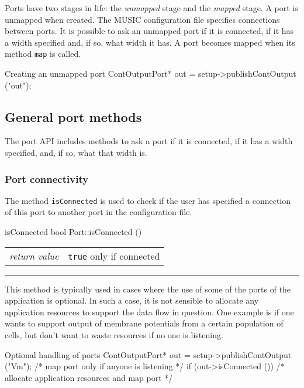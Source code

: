 \documentclass[a4paper,twoside]{report}
\makeatletter
\newenvironment{parameters}%
{\begin{tabular}{@{\hspace{2em}}lp{0.6\textwidth}}}%
{\end{tabular}\par\vspace{1mm}\par\hrule\par\vspace{5mm}}
\makeatother
\begin{document}
\pagebreak
Ports have two stages in life: the \emph{unmapped} stage and the
\emph{mapped} stage.  A port is unmapped when created.  The MUSIC
configuration file specifies connections between ports.  It is
possible to ask an unmapped port if it is connected, if it has a width
specified and, if so, what width it has.  A port becomes mapped when
its method \lstinline|map| is called.

\begin{code}{Creating an unmapped port}
ContOutputPort* out =
   setup->publishContOutput ("out");
\end{code}

\subsection{General port methods}

The port API includes methods to ask a port if it is connected, if it
has a width specified, and, if so, what that width is.

\subsubsection{Port connectivity}

The method \lstinline|isConnected| is used to check if the user has
specified a connection of this port to another port in the
configuration file.

\begin{head}{isConnected}
  bool Port::isConnected ()
\end{head}
\begin{parameters}
  \emph{return value} & \lstinline|true| only if connected\\
\end{parameters}

This method is typically used in cases where the use of some of the
ports of the application is optional.  In such a case, it is not
sensible to allocate any application resources to support the data
flow in question.  One example is if one wants to support output of
membrane potentials from a certain population of cells, but don't want
to waste resources if no one is listening.

\begin{code}{Optional handling of ports}
ContOutputPort* out =
   setup->publishContOutput ("Vm");
/* map port only if anyone is listening */
if (out->isConnected ())
  /* allocate application resources and map port */
\end{code}
\end{document}
